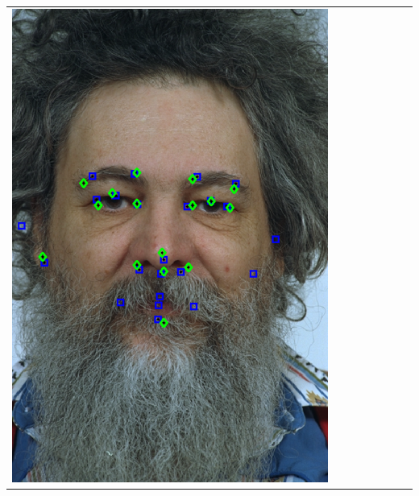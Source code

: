 \documentclass[landscape,final,a0paper,fontscale=0.27065]{baposter}
\begin{document}
\begin{poster}
{{\begin{tabular}{@{}rccccccc@{}}
 \parbox[c]{0.11\linewidth}{\includegraphics[width=\linewidth]{images/l_fa_success_2.pdf}} &

\end{tabular}}}
\end{poster}
\end{document}
